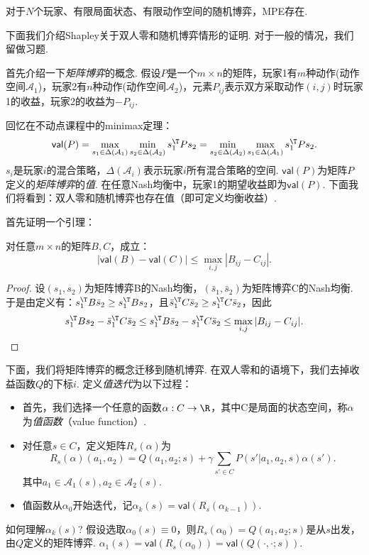\begin{theorem}
    对于$N$个玩家、有限局面状态、有限动作空间的随机博弈，MPE存在.
\end{theorem}

下面我们介绍Shapley关于双人零和随机博弈情形的证明. 对于一般的情况，我们留做习题.

\newcommand{\val}{\mathsf{val}}
首先介绍一下\emph{矩阵博弈}的概念. 假设$P$是一个$m\times n$的矩阵，玩家1有$m$种动作(动作空间$\mathcal A_1$)，玩家2有$n$种动作(动作空间$\mathcal A_2$)，元素$P_{ij}$表示双方采取动作$(i,j)$时玩家1的收益，玩家2的收益为$-P_{ij}$. 

回忆在不动点课程中的minimax定理：
\[\val(P)=\max_{s_1\in \Delta(\mathcal A_1)}\min_{s_2\in\Delta(\mathcal A_2)}s_1^\T Ps_2=\min_{s_2\in \Delta(\mathcal A_2)}\max_{s_1\in\Delta(\mathcal A_1)}s_1^\T Ps_2.\]
$s_i$是玩家$i$的混合策略，$\Delta(\mathcal A_i)$表示玩家$i$所有混合策略的空间. $\val(P)$为矩阵$P$定义的\emph{矩阵博弈}的\emph{值}. 在任意Nash均衡中，玩家1的期望收益即为$\val(P)$. 下面我们将看到：双人零和随机博弈也存在值（即可定义均衡收益）.

首先证明一个引理：
\begin{lemma}\label{lemma:matrix}
    对任意$m\times n$的矩阵$B,C$，成立：
    \[|\val(B)-\val(C)| \leq \max_{i,j}|B_{ij} - C_{ij}|.\]
\end{lemma}

\begin{proof}
    设$(s_1,s_2)$为矩阵博弈B的Nash均衡，$(\bar{s}_1,\bar{s}_2)$为矩阵博弈C的Nash均衡. 于是由定义有：$s_1^\T B\bar{s}_2  \geq s_1^\T  B s_2$，且$\bar{s}_1 ^\T  C\bar{s}_2 \geq s_1^\T  C \bar{s}_2 $，因此
    \[s_1^\T  B s_2 - \bar{s}_1 ^\T  C\bar{s}_2  \leq s_1^\T  B\bar{s}_2  - s_1^\T  C \bar{s}_2  \leq \max_{i,j}|B_{ij} - C_{ij}|.\]
\end{proof}

下面，我们将矩阵博弈的概念迁移到随机博弈. 在双人零和的语境下，我们去掉收益函数$Q$的下标$i$. 定义\emph{值迭代}为以下过程：
\begin{itemize}
    \item 首先，我们选择一个任意的函数$\alpha: C\to \R$，其中C是局面的状态空间，称$\alpha$为\emph{值函数}（value function）.
    \item 对任意$s\in C$，定义矩阵$R_s(\alpha)$为
    \[R_s(\alpha)(a_1,a_2) = Q(a_1,a_2;s) + \gamma \sum_{s'\in C}P(s'|a_1,a_2,s)\alpha(s').\]
    其中$a_1\in \mathcal A_1(s), a_2\in \mathcal A_2(s)$.
    \item 值函数从$\alpha_0$开始迭代，记$\alpha_k(s)=\val(R_s(\alpha_{k-1}))$. 
\end{itemize}
如何理解$\alpha_k(s)$? 假设选取$\alpha_0(s)\equiv 0$，则$R_s(\alpha_0)=Q(a_1,a_2;s)$是从$s$出发，由$Q$定义的矩阵博弈. $\alpha_1(s)=\val(R_s(\alpha_0))=\val(Q(\cdot,\cdot;s))$.

